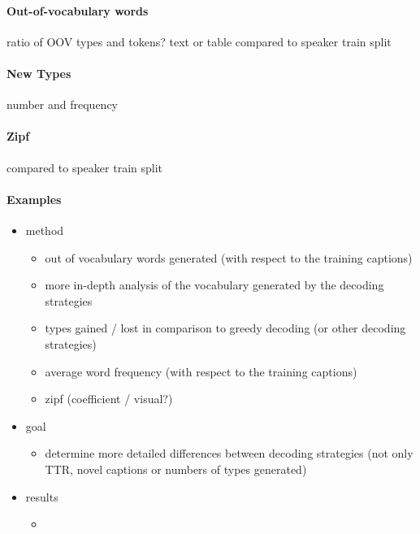 \documentclass[11pt,a4paper]{article}
\begin{document}
\paragraph{Out-of-vocabulary words} ratio of OOV types and tokens? text or table
compared to speaker train split

\paragraph{New Types} number and frequency

\paragraph{Zipf} compared to speaker train split

\paragraph{Examples}

\begin{itemize}

\item method
	\begin{itemize}
	\item out of vocabulary words generated (with respect to the training captions)
	\item more in-depth analysis of the vocabulary generated by the decoding strategies
	\item types gained / lost in comparison to greedy decoding (or other decoding strategies)

	\item average word frequency (with respect to the training captions)
	\item zipf (coefficient / visual?)
	\end{itemize}

\item goal
	\begin{itemize}
	\item determine more detailed differences between decoding strategies (not only TTR, novel captions or numbers of types generated)
	\end{itemize}

\item results
	\begin{itemize}
	\item
	\end{itemize}

\end{itemize}
\end{document}
